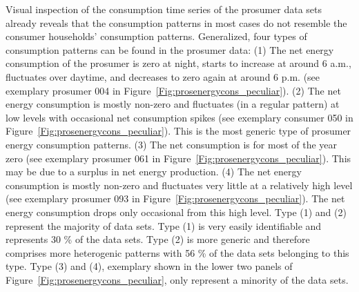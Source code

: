 Visual inspection of the consumption time series of the prosumer data sets already reveals that the consumption patterns in most cases do not resemble the consumer households' consumption patterns. Generalized, four types of consumption patterns can be found in the prosumer data: (1) The net energy consumption of the prosumer is zero at night, starts to increase at around 6 a.m., fluctuates over daytime, and decreases to zero again at around 6 p.m. (see exemplary prosumer 004 in Figure~\ref{Fig:prosenergycons_peculiar}). (2) The net energy consumption is mostly non-zero and fluctuates (in a regular pattern) at low levels with occasional net consumption spikes (see exemplary consumer 050 in Figure~\ref{Fig:prosenergycons_peculiar}). This is the most generic type of prosumer energy consumption patterns. (3) The net consumption is for most of the year zero (see exemplary prosumer 061 in Figure~\ref{Fig:prosenergycons_peculiar}). This may be due to a surplus in net energy production. (4) The net energy consumption is mostly non-zero and fluctuates very little at a relatively high level (see exemplary prosumer 093 in Figure~\ref{Fig:prosenergycons_peculiar}). The net energy consumption drops only occasional from this high level. Type (1) and (2) represent the majority of data sets. Type (1) is very easily identifiable and represents 30 \% of the data sets. Type (2) is more generic and therefore comprises more heterogenic patterns with 56 \% of the data sets belonging to this type. Type (3) and (4), exemplary shown in the lower two panels of Figure~\ref{Fig:prosenergycons_peculiar}, only represent a minority of the data sets.

